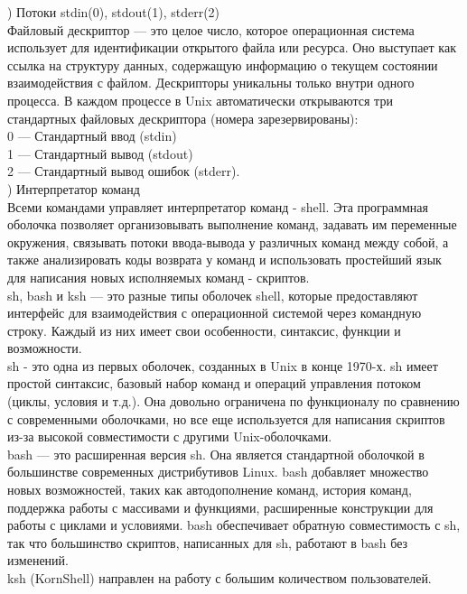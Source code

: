 ) Потоки stdin(0), stdout(1), stderr(2) \\
Файловый дескриптор — это целое число, которое операционная система использует для идентификации открытого файла или ресурса. Оно выступает как ссылка на структуру данных, содержащую информацию о текущем состоянии взаимодействия с файлом. Дескрипторы уникальны только внутри одного процесса.  В каждом процессе в Unix автоматически открываются три стандартных файловых дескриптора (номера зарезервированы): \\
0 — Стандартный ввод (stdin) \\
1 — Стандартный вывод (stdout) \\
2 — Стандартный вывод ошибок (stderr). \\

) Интерпретатор команд \\
Всеми командами управляет интерпретатор команд - shell. Эта программная оболочка позволяет организовывать выполнение команд, задавать им переменные окружения, связывать потоки ввода-вывода у различных команд между собой, а также анализировать коды возврата у команд и использовать простейший язык для написания новых исполняемых команд - скриптов. \\
sh, bash и ksh — это разные типы оболочек shell, которые предоставляют интерфейс для взаимодействия с операционной системой через командную строку. Каждый из них имеет свои особенности, синтаксис, функции и возможности. \\
sh - это одна из первых оболочек, созданных в Unix в конце 1970-х. sh имеет простой синтаксис, базовый набор команд и операций управления потоком (циклы, условия и т.д.). Она довольно ограничена по функционалу по сравнению с современными оболочками, но все еще используется для написания скриптов из-за высокой совместимости с другими Unix-оболочками. \\
bash — это расширенная версия sh. Она является стандартной оболочкой в большинстве современных дистрибутивов Linux. bash добавляет множество новых возможностей, таких как автодополнение команд, история команд, поддержка работы с массивами и функциями, расширенные конструкции для работы с циклами и условиями. bash обеспечивает обратную совместимость с sh, так что большинство скриптов, написанных для sh, работают в bash без изменений. \\
ksh (KornShell) направлен на работу с большим количеством пользователей. \\


